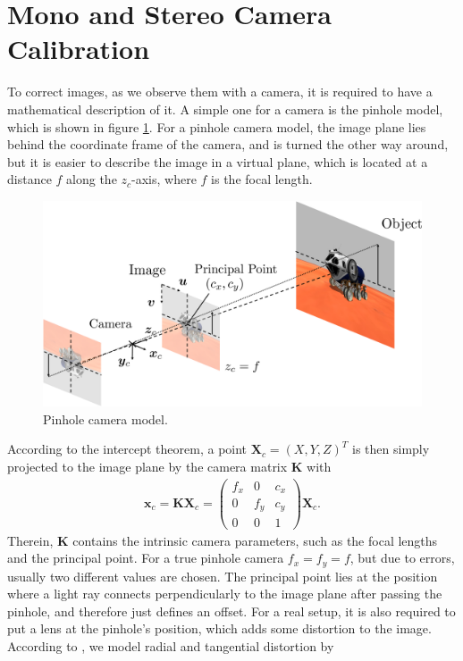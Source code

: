 \section{Mono and Stereo Camera Calibration}
\label{sec::32_cc}
To correct images, as we observe them with a camera, it is required to have a mathematical description of it. A simple one for a camera is the pinhole model, which is shown in figure \ref{fig::32_pin_hole_camera}. For a pinhole camera model, the image plane lies behind the coordinate frame of the camera, and is turned the other way around, but it is easier to describe the image in a virtual plane, which is located at a distance $f$ along the $z_c$-axis, where $f$ is the focal length.
\begin{figure}[h!]
	\centering
	\includegraphics[scale=.28]{chapters/03_fundamentals_of_image_processing/img/pin_hole_camera.png}
	\caption{Pinhole camera model.}
	\label{fig::32_pin_hole_camera}
\end{figure}
According to the intercept theorem, a point $\bm{X}_c = (X,Y,Z)^T$ is then simply projected to the image plane by the camera matrix $\bm{K}$ with
\begin{align}
	\bm{x}_c = \bm{K}\bm{X}_c = \begin{pmatrix}
	f_x & 0   & c_x \\
	0   & f_y & c_y \\
	0   & 0   & 1
	\end{pmatrix}\bm{X}_c.
	\label{eq::32_focal_intrinsics}
\end{align}
Therein, $\bm{K}$ contains the intrinsic camera parameters, such as the focal lengths and the principal point. For a true pinhole camera $f_x = f_y =f$, but due to errors, usually two different values are chosen. The principal point lies at the position where a light ray connects perpendicularly to the image plane after passing the pinhole, and therefore just defines an offset. For a real setup, it is also required to put a lens at the pinhole's position, which adds some distortion to the image. According to \cite{duane1971close}, we model radial and tangential distortion by
